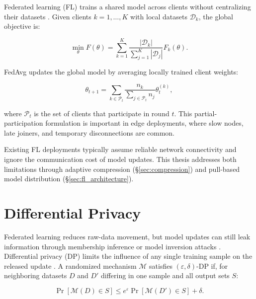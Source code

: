 Federated learning (FL) trains a shared model across clients without centralizing
their datasets \cite{mcmahan2017communication, kairouz2021advances}. Given
clients $k=1,\dots,K$ with local datasets $\mathcal{D}_k$, the global objective
is:

\begin{equation}
    \min_{\theta} F(\theta) =
    \sum_{k=1}^{K}
    \frac{|\mathcal{D}_k|}{\sum_{j=1}^{K}|\mathcal{D}_j|}
    F_k(\theta).
    \label{eq:bg_fl_objective}
\end{equation}

FedAvg updates the global model by averaging locally trained client weights:

\begin{equation}
    \theta_{t+1} =
    \sum_{k \in \mathcal{P}_t}
    \frac{n_k}{\sum_{j \in \mathcal{P}_t} n_j}
    \theta_t^{(k)},
    \label{eq:bg_fedavg}
\end{equation}

where $\mathcal{P}_t$ is the set of clients that participate in round $t$. This
partial-participation formulation is important in edge deployments, where slow
nodes, late joiners, and temporary disconnections are common.

Existing FL deployments typically assume reliable network connectivity and
ignore the communication cost of model updates. This thesis addresses both
limitations through adaptive compression (\S\ref{sec:compression}) and
pull-based model distribution (\S\ref{sec:fl_architecture}).

\section{Differential Privacy}
\label{sec:differential_privacy}

Federated learning reduces raw-data movement, but model updates can still leak
information through membership inference or model inversion attacks
\cite{shokri2017membership, fredrikson2015model}. Differential privacy (DP)
limits the influence of any single training sample on the released update
\cite{dwork2006differential, dwork2014algorithmic}. A randomized mechanism
$\mathcal{M}$ satisfies $(\varepsilon,\delta)$-DP if, for neighboring datasets
$D$ and $D'$ differing in one sample and all output sets $S$:

\begin{equation}
    \Pr[\mathcal{M}(D) \in S]
    \leq
    e^\varepsilon \Pr[\mathcal{M}(D') \in S] + \delta .
    \label{eq:bg_dp}
\end{equation}


